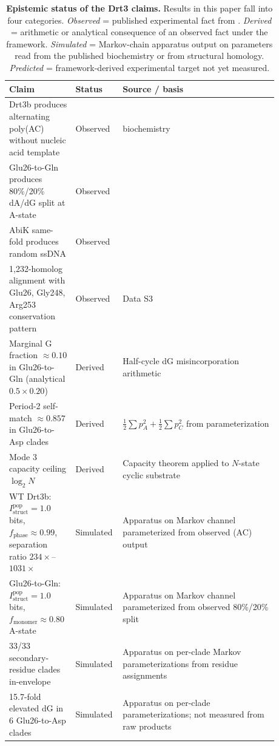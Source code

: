 \documentclass[aps,prx,reprint,amsmath,amssymb,floatfix,superscriptaddress,nofootinbib]{revtex4-2}
\theoremstyle{plain-thm}
\theoremstyle{definition-thm}
\newcommand{\Istructpop}{I_{\mathrm{struct}}^{\mathrm{pop}}}
\newcommand{\fphase}{f_{\mathrm{phase}}}
\newcommand{\fmonomer}{f_{\mathrm{monomer}}}
\begin{document}
\begin{table}
\caption{\textbf{Epistemic status of the Drt3 claims.} Results in this paper fall into four categories. \emph{Observed} = published experimental fact from \citet{Deng2026}. \emph{Derived} = arithmetic or analytical consequence of an observed fact under the framework. \emph{Simulated} = Markov-chain apparatus output on parameters read from the published biochemistry or from structural homology. \emph{Predicted} = framework-derived experimental target not yet measured.}
\label{tab:epistemic_status}
\begin{tabular}{p{0.20\linewidth} p{0.13\linewidth} p{0.55\linewidth}}
\toprule
Claim & Status & Source / basis \\
\midrule
Drt3b produces alternating poly(AC) without nucleic acid template & Observed & \citet{Deng2026} biochemistry \\
Glu26-to-Gln produces 80\%/20\% dA/dG split at A-state & Observed & \citet[Fig.\ 4J]{Deng2026} \\
AbiK same-fold produces random ssDNA & Observed & \citet{Deng2026} \\
1,232-homolog alignment with Glu26, Gly248, Arg253 conservation pattern & Observed & \citet{Deng2026} Data S3 \\
Marginal G fraction $\approx 0.10$ in Glu26-to-Gln (analytical $0.5 \times 0.20$) & Derived & Half-cycle dG misincorporation arithmetic \\
Period-2 self-match $\approx 0.857$ in Glu26-to-Asp clades & Derived & $\frac{1}{2}\sum p_A^2 + \frac{1}{2}\sum p_C^2$ from parameterization \\
Mode 3 capacity ceiling $\log_2 N$ & Derived & Capacity theorem applied to $N$-state cyclic substrate \\
WT Drt3b: $\Istructpop = 1.0$ bits, $\fphase \approx 0.99$, separation ratio $234\times$--$1031\times$ & Simulated & Apparatus on Markov channel parameterized from observed (AC) output \\
Glu26-to-Gln: $\Istructpop = 1.0$ bits, $\fmonomer \approx 0.80$ A-state & Simulated & Apparatus on Markov channel parameterized from observed 80\%/20\% split \\
33/33 secondary-residue clades in-envelope & Simulated & Apparatus on per-clade Markov parameterizations from residue assignments \\
15.7-fold elevated dG in 6 Glu26-to-Asp clades & Simulated & Apparatus on per-clade parameterizations; not measured from raw products \\

\end{tabular}
\end{table}
\end{document}
